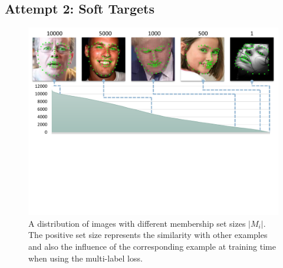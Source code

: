 \documentclass[letterpaper]{article} %
\begin{document}
\subsection{Attempt 2: Soft Targets}
\label{sec:softtarget}

\begin{figure}[t]
\begin{center}
   \includegraphics[width=1\linewidth]{fig/ImgNbCnt.pdf}
\end{center}
   \caption{A distribution of images with different membership set sizes $|M_i|$. The positive set size represents the similarity with other examples and also the influence of the corresponding example at training time when using the multi-label loss.}
\label{fig:imgnbcnt}
\end{figure}
\end{document}
